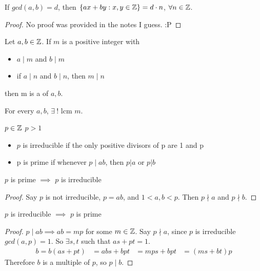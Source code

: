\documentclass[openany]{report}
\begin{document}
\begin{corollary}
    If $gcd(a,b) = d$, then $\{ax + by: x,y \in \mathbb{Z}\} = d\cdot n$, $\forall n \in \mathbb{Z}$.
\end{corollary}
\begin{proof}
    No proof was provided in the notes I guess. :P 
\end{proof}
\begin{definition}
    Let $a,b \in \mathbb{Z}$. If $m$ is a positive integer with
    \begin{itemize}
        \item $a\mid m$ and $b \mid m$
        \item if $a \mid n$ and $b \mid n$, then $m \mid n$
    \end{itemize}
    then m is a  of $a,b$.
\end{definition}
\begin{theorem}
    For every $a,b$, $\exists \ !$ lcm $m$.
\end{theorem}
\begin{definition}
    $p \in \mathbb{Z}$ $p > 1$
    \begin{itemize}
        \item $p$ is irreducible if the only positive divisors of p are 1 and p
        \item p is prime if whenever $p \mid ab$, then $p |a$ or $p |b$
    \end{itemize}
\end{definition}
\begin{prop}
    $p$ is prime $\implies$ $p$ is irreducible
\end{prop}
\begin{proof}
    Say $p$ is not irreducible, $p = ab$, and $1 < a,b < p$. Then $p \nmid a$ and $p \nmid b$.
\end{proof}
\begin{prop}
    $p$ is irreducible $\implies$ $p$ is prime
\end{prop}
\begin{proof}
    $p \mid ab \implies ab = mp$ for some $m \in \mathbb{Z}$. Say $p \nmid a$, since $p$ is irreducible $gcd(a,p) = 1$. So $\exists s,t$ such that $as + pt = 1$. 
    \begin{align*}
      b = b(as +pt) &= abs + bpt  
      &= mps + bpt
      &= (ms + bt)p
    \end{align*}
    Therefore $b$ is a multiple of $p$, so $p \mid b$.
\end{proof}
\end{document}

